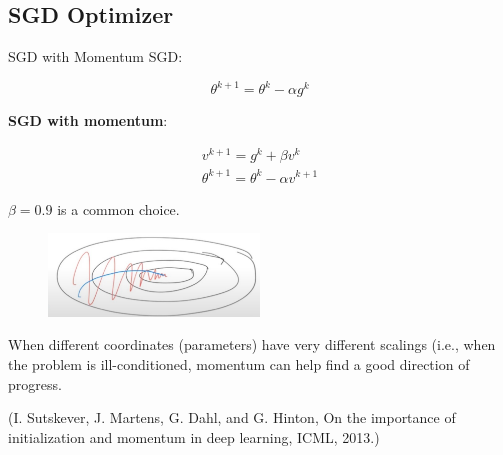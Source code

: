 \subsection{SGD Optimizer}

\begin{frame}[allowframebreaks]

\begin{mydefinitionblock}{6.19}{SGD with Momentum}
    SGD:

    $$
    \theta^{k+1}=\theta^{k}-\alpha g^{k}
    $$

    \textbf{SGD with momentum}:

    $$
    \begin{gathered}
    v^{k+1}=g^{k}+\beta v^{k} \\
    \theta^{k+1}=\theta^{k}-\alpha v^{k+1}
    \end{gathered}
    $$

    $\beta=0.9$ is a common choice.

    \begin{figure}[H]
        \centering
        \includegraphics[width=0.5\textwidth]{.././assets/6.9.png}
    \end{figure}

    When different coordinates (parameters) have very different scalings (i.e., when the problem is ill-conditioned, momentum can help find a good direction of progress.

    (I. Sutskever, J. Martens, G. Dahl, and G. Hinton, On the importance of initialization and momentum in deep learning, ICML, 2013.)
\end{mydefinitionblock}

\end{frame}

